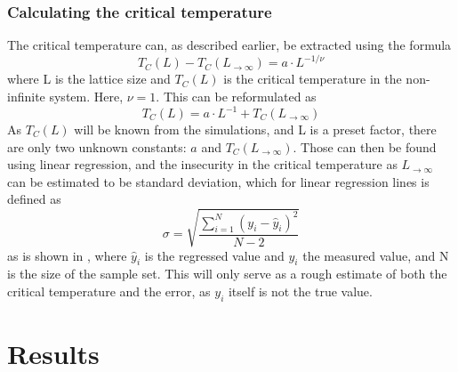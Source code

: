 \documentclass[10pt,a4paper]{article}
\begin{document}
\subsubsection{Calculating the critical temperature}
The critical temperature can, as described earlier, be extracted using the formula 
$$T_C(L)-T_C(L_{\rightarrow \infty})=a\cdot L^{-1/\nu}$$
where L is the lattice size and $T_C(L)$ is the critical temperature in the non-infinite system. Here, $\nu=1$. This can be reformulated as 
$$T_C(L)=a\cdot L^{-1}+T_C(L_{\rightarrow \infty})$$
As $T_C(L)$ will be known from the simulations, and L is a preset factor, there are only two unknown constants: $a$ and $T_C(L_{\rightarrow \infty})$. Those can then be found using linear regression, and the insecurity in the critical temperature as $L_{\rightarrow \infty}$ can be estimated to be standard deviation, which for linear regression lines is defined as 
\begin{equation}
\sigma=\sqrt{\frac{\sum_{i=1}^{N}(y_i-\hat{y}_i)^2}{N-2}}
\end{equation}
as is shown in \cite{devore2012modern}, where $\hat{y}_i$ is the regressed value and $y_i$ the measured value, and N is the size of the sample set.
This will only serve as a rough estimate of both the critical temperature and the error, as $y_i$ itself is not the true value. 
\section{Results}
\end{document}
